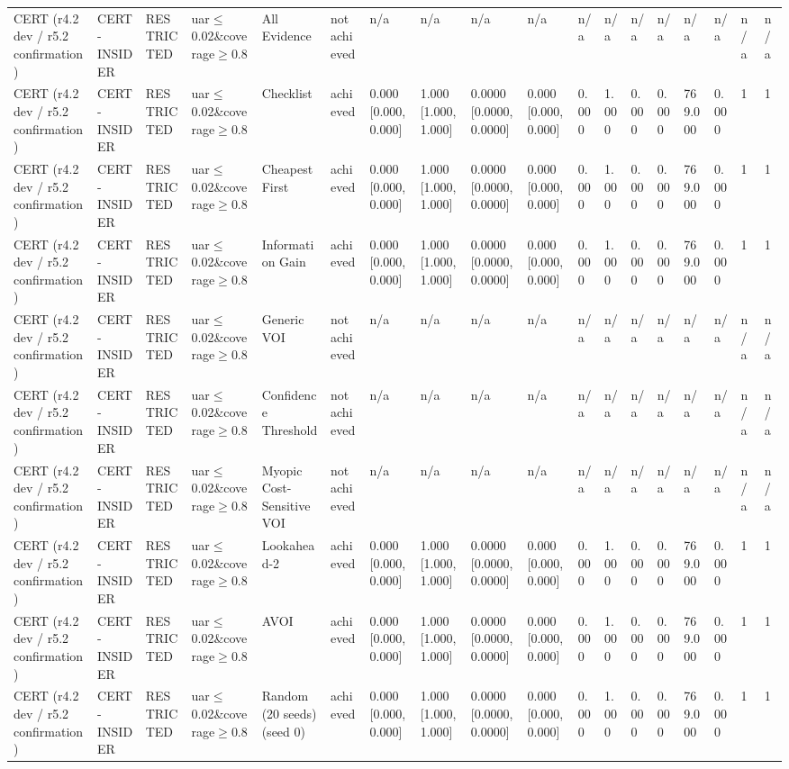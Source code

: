 \begin{table}[!ht]
{\begin{tabular}{llllllllllllllllll}
CERT (r4.2 dev / r5.2 confirmation) & CERT-INSIDER & RESTRICTED & uar$\le$0.02\&coverage$\ge$0.8 & All Evidence & not achieved & n/a & n/a & n/a & n/a & n/a & n/a & n/a & n/a & n/a & n/a & n/a & n/a \\
CERT (r4.2 dev / r5.2 confirmation) & CERT-INSIDER & RESTRICTED & uar$\le$0.02\&coverage$\ge$0.8 & Checklist & achieved & 0.000 [0.000, 0.000] & 1.000 [1.000, 1.000] & 0.0000 [0.0000, 0.0000] & 0.000 [0.000, 0.000] & 0.000 & 1.000 & 0.000 & 0.000 & 769.000 & 0.000 & 1 & 1 \\
CERT (r4.2 dev / r5.2 confirmation) & CERT-INSIDER & RESTRICTED & uar$\le$0.02\&coverage$\ge$0.8 & Cheapest First & achieved & 0.000 [0.000, 0.000] & 1.000 [1.000, 1.000] & 0.0000 [0.0000, 0.0000] & 0.000 [0.000, 0.000] & 0.000 & 1.000 & 0.000 & 0.000 & 769.000 & 0.000 & 1 & 1 \\
CERT (r4.2 dev / r5.2 confirmation) & CERT-INSIDER & RESTRICTED & uar$\le$0.02\&coverage$\ge$0.8 & Information Gain & achieved & 0.000 [0.000, 0.000] & 1.000 [1.000, 1.000] & 0.0000 [0.0000, 0.0000] & 0.000 [0.000, 0.000] & 0.000 & 1.000 & 0.000 & 0.000 & 769.000 & 0.000 & 1 & 1 \\
CERT (r4.2 dev / r5.2 confirmation) & CERT-INSIDER & RESTRICTED & uar$\le$0.02\&coverage$\ge$0.8 & Generic VOI & not achieved & n/a & n/a & n/a & n/a & n/a & n/a & n/a & n/a & n/a & n/a & n/a & n/a \\
CERT (r4.2 dev / r5.2 confirmation) & CERT-INSIDER & RESTRICTED & uar$\le$0.02\&coverage$\ge$0.8 & Confidence Threshold & not achieved & n/a & n/a & n/a & n/a & n/a & n/a & n/a & n/a & n/a & n/a & n/a & n/a \\
CERT (r4.2 dev / r5.2 confirmation) & CERT-INSIDER & RESTRICTED & uar$\le$0.02\&coverage$\ge$0.8 & Myopic Cost-Sensitive VOI & not achieved & n/a & n/a & n/a & n/a & n/a & n/a & n/a & n/a & n/a & n/a & n/a & n/a \\
CERT (r4.2 dev / r5.2 confirmation) & CERT-INSIDER & RESTRICTED & uar$\le$0.02\&coverage$\ge$0.8 & Lookahead-2 & achieved & 0.000 [0.000, 0.000] & 1.000 [1.000, 1.000] & 0.0000 [0.0000, 0.0000] & 0.000 [0.000, 0.000] & 0.000 & 1.000 & 0.000 & 0.000 & 769.000 & 0.000 & 1 & 1 \\
CERT (r4.2 dev / r5.2 confirmation) & CERT-INSIDER & RESTRICTED & uar$\le$0.02\&coverage$\ge$0.8 & AVOI & achieved & 0.000 [0.000, 0.000] & 1.000 [1.000, 1.000] & 0.0000 [0.0000, 0.0000] & 0.000 [0.000, 0.000] & 0.000 & 1.000 & 0.000 & 0.000 & 769.000 & 0.000 & 1 & 1 \\
CERT (r4.2 dev / r5.2 confirmation) & CERT-INSIDER & RESTRICTED & uar$\le$0.02\&coverage$\ge$0.8 & Random (20 seeds) (seed 0) & achieved & 0.000 [0.000, 0.000] & 1.000 [1.000, 1.000] & 0.0000 [0.0000, 0.0000] & 0.000 [0.000, 0.000] & 0.000 & 1.000 & 0.000 & 0.000 & 769.000 & 0.000 & 1 & 1 \\

\end{tabular}}
\end{table}
